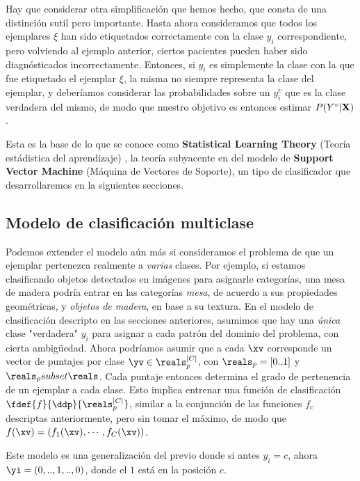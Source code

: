 Hay que considerar otra simplificación que hemos hecho, que consta de una distinción sutil pero importante. Hasta ahora consideramos que todos los ejemplares $\xi$ han sido etiquetados correctamente con la clase $y_i$ correspondiente, pero volviendo al ejemplo anterior, ciertos pacientes pueden haber sido diagnósticados incorrectamente. Entonces, si $y_i$ es simplemente la clase con la que fue etiquetado el ejemplar $\xi$, la misma no siempre representa la clase del ejemplar, y deberíamos considerar las probabilidades sobre un $y_i^v$ que es la clase verdadera del mismo, de modo que nuestro objetivo es entonces estimar $P(Y^v | \mathbf{X})$. 


Esta es la base de lo que se conoce como \textbf{Statistical Learning Theory}  (Teoría estádistica del aprendizaje) \cite{vapnik1998,mostafa2012}, la teoría subyacente en del modelo de \textbf{Support Vector Machine} (Máquina de Vectores de Soporte), un tipo de clasificador que desarrollaremos en la siguientes secciones.




\subsection{Modelo de clasificación multiclase}

\newcommand{\RPC}{\reals_p^{|C|}}
\newcommand{\RP}{\reals_p=[0..1]}

Podemos extender el modelo aún más si consideramos el problema de que un ejemplar pertenezca realmente a \textit{varias} clases. Por ejemplo, si estamos clasificando objetos detectados en imágenes para asignarle categorías, una mesa de madera podría entrar en las categorías \textit{mesa}, de acuerdo a sus propiedades geométricas, y \textit{objetos de madera}, en base a su textura. En el modelo de clasificación descripto en las secciones anteriores, asumimos que hay una \textit{única} clase "verdadera" $y_i$ para asignar a cada patrón del dominio del problema, con cierta ambigüedad. Ahora podríamos asumir que a cada $\xv$ corresponde un vector de puntajes por clase $\yv \in \RPC$, con $\RP$ y $\reals_p subset \reals$. Cada puntaje entonces determina el grado de pertenencia de un ejemplar a cada clase. Esto implica entrenar una función de clasificación $\fdef{f}{\ddp}{\RPC} $, similar a la conjunción de las funciones $f_c$ descriptas anteriormente, pero sin tomar el máximo, de modo que $f(\xv)=(f_1(\xv),\cdots,f_C(\xv))$.

Este modelo es una generalización del previo donde si antes $y_i=c$, ahora $\yi= (0,..,1,..,0)$, donde el $1$ está en la posición $c$. 
